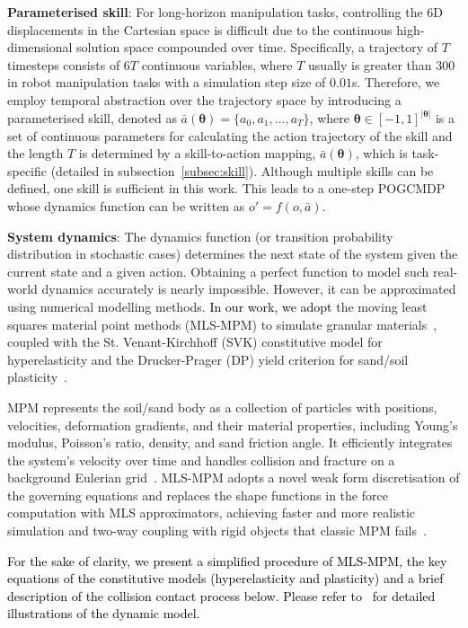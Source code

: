 \documentclass[letterpaper, 10 pt, journal, twoside]{ieeetran}
\newcommand{\rp}[1]{\textcolor{black}{#1}}
\begin{document}
\textbf{Parameterised skill}: For long-horizon manipulation tasks, controlling the 6D displacements in the Cartesian space is difficult due to the continuous high-dimensional solution space compounded over time. Specifically, a trajectory of $T$ timesteps consists of $6T$ continuous variables, where $T$ usually is greater than $300$ in robot manipulation tasks with a simulation step size of $0.01$s. 
Therefore, we employ temporal abstraction over the trajectory space by introducing a parameterised skill, denoted as $\bar{a}(\pmb{\theta})=\{a_0, a_1, ..., a_T\}$, where $\pmb{\theta}\in[-1,1]^{|\pmb{\theta}|}$ is a set of continuous parameters for calculating the action trajectory of the skill and the length $T$ is determined by a skill-to-action mapping, $\bar{a}(\pmb{\theta})$, which is task-specific (detailed in subsection~\ref{subsec:skill}). 
Although multiple skills can be defined, one skill is sufficient in this work. 
This leads to a one-step POGCMDP whose dynamics function can be written as $o' = f(o, \bar{a})$.

\textbf{System dynamics}: The dynamics function (or transition probability distribution in stochastic cases) determines the next state of the system given the current state and a given action. Obtaining a perfect function to model such real-world dynamics accurately is nearly impossible. However, it can be approximated using numerical modelling methods. \rp{In our work, we adopt} the moving least squares material point methods (MLS-MPM) to simulate granular materials~\cite{hu2018moving}, coupled with the St. Venant-Kirchhoff (SVK) constitutive model for hyperelasticity and the Drucker-Prager (DP) yield criterion for sand/soil plasticity~\cite{drucker1952soil,klar2016drucker}.

MPM represents the soil/sand body as a collection of particles with positions, velocities, deformation gradients, and their material properties, including Young's modulus, Poisson's ratio, density, and sand friction angle. It efficiently integrates the system's velocity over time and handles collision and fracture on a background Eulerian grid~\cite{klar2016drucker}. MLS-MPM adopts a novel weak form discretisation of the governing equations and replaces the shape functions in the force computation with MLS approximators, achieving faster and more realistic simulation and two-way coupling with rigid objects that classic MPM fails~\cite{hu2018moving}. 

\rp{For the sake of clarity, we present a simplified procedure of MLS-MPM, the key equations of the constitutive models (hyperelasticity and plasticity) and a brief description of the collision contact process below. Please refer to~\cite{klar2016drucker,hu2018moving,xy2024sysid} for detailed illustrations of the dynamic model.} 
\end{document}
